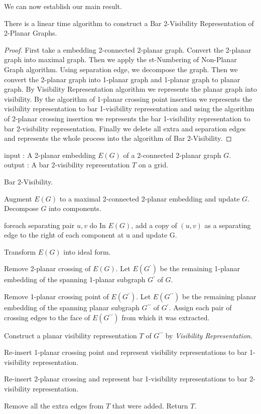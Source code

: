 We can now establish our main result.
\begin{theorem}
There is a linear time algorithm to construct a Bar 2-Visibility Representation of 2-Planar Graphs.
\end{theorem}
\begin{proof}
First take a embedding 2-connected 2-planar graph. Convert the 2-planar graph into maximal graph. Then we apply the st-Numbering of Non-Planar Graph algorithm. Using separation edge, we decompose the graph. Then we convert the 2-planar graph into 1-planar graph and 1-planar graph to planar graph. By Visibility Representation algorithm we represents the planar graph into visibility. By the algorithm of 1-planar crossing point insertion we represents the visibility representation to bar 1-visibility representation and using the algorithm of 2-planar crossing insertion we represents the bar 1-visibility representation to bar 2-visibility representation. Finally we delete all extra and separation edges and represents the whole process into the algorithm of Bar 2-Visibility.
\end{proof}

\begin{algorithm}[H] 
input : {A 2-planar embedding $E(G)$ of a 2-connected 2-planar graph $G$.} \\
output : {A bar 2-visibility representation $T$ on a grid.}
\caption{Bar 2-Visibility.}
\label{b2vr}
\begin{algorithmic}[1] 
\STATE Augment $E(G)$ to a maximal 2-connected 2-planar embedding and update $G$.
\STATE Decompose $G$ into components.

\STATE foreach separating pair ${u, v}$ do
\STATE In $E(G)$, add a copy of $(u, v)$ as a separating edge to the right of each
 component at u and update G.

\STATE Transform $E(G)$ into ideal form.

\STATE Remove 2-planar crossing of $E(G)$. Let $E(G{^\prime})$ be the remaining 1-planar embedding of the spanning 1-planar subgraph $G{^\prime}$ of $G$.

\STATE Remove 1-planar crossing point of $E(G{^\prime})$. Let $E(G{^\prime}{^\prime})$ be the remaining planar embedding of the spanning planar subgraph $G{^\prime}{^\prime}$ of $G{^\prime}$. Assign each pair of crossing edges to the face of $E(G{^\prime}{^\prime})$ from which it was extracted.


\STATE Construct a planar visibility representation $T$ of $G{^\prime}{^\prime}$ by
\emph{Visibility Representation}.


\STATE Re-insert 1-planar crossing point and represent visibility representations to bar 1-visibility representation.



\STATE Re-insert 2-planar crossing and represent bar 1-visibility representations to bar 2-visibility representation.


\STATE Remove all the extra edges from $T$ that were added.
\STATE Return $T$.


\end{algorithmic}
\end{algorithm}


